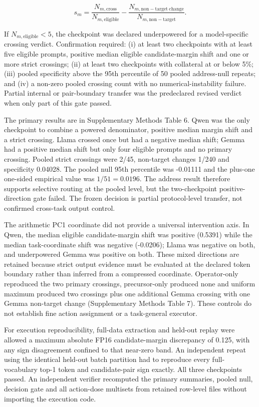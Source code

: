 \documentclass[10pt]{article}
\begin{document}
\begin{equation*}
s_m=\frac{N_{m,\mathrm{cross}}}{N_{m,\mathrm{eligible}}}-
\frac{N_{m,\mathrm{non-target\ change}}}{N_{m,\mathrm{non-target}}}.
\end{equation*}

If \(N_{m,\mathrm{eligible}}<5\), the checkpoint was declared underpowered for a model-specific crossing verdict. Confirmation required: (i) at least two checkpoints with at least five eligible prompts, positive median eligible candidate-margin shift and one or more strict crossings; (ii) at least two checkpoints with collateral at or below 5\%; (iii) pooled specificity above the 95th percentile of 50 pooled address-null repeats; and (iv) a non-zero pooled crossing count with no numerical-instability failure. Partial internal or pair-boundary transfer was the predeclared revised verdict when only part of this gate passed.

The primary results are in Supplementary Methods Table 6. Qwen was the only checkpoint to combine a powered denominator, positive median margin shift and a strict crossing. Llama crossed once but had a negative median shift; Gemma had a positive median shift but only four eligible prompts and no primary crossing. Pooled strict crossings were 2/45, non-target changes 1/240 and specificity 0.04028. The pooled null 95th percentile was -0.01111 and the plus-one one-sided empirical value was \(1/51=0.0196\). The address result therefore supports selective routing at the pooled level, but the two-checkpoint positive-direction gate failed. The frozen decision is partial protocol-level transfer, not confirmed cross-task output control.

The arithmetic PC1 coordinate did not provide a universal intervention axis. In Qwen, the median eligible candidate-margin shift was positive (0.5391) while the median task-coordinate shift was negative (-0.0206); Llama was negative on both, and underpowered Gemma was positive on both. These mixed directions are retained because strict output evidence must be evaluated at the declared token boundary rather than inferred from a compressed coordinate. Operator-only reproduced the two primary crossings, precursor-only produced none and uniform maximum produced two crossings plus one additional Gemma crossing with one Gemma non-target change (Supplementary Methods Table 7). These controls do not establish fine action assignment or a task-general executor.

For execution reproducibility, full-data extraction and held-out replay were allowed a maximum absolute FP16 candidate-margin discrepancy of 0.125, with any sign disagreement confined to that near-zero band. An independent repeat using the identical held-out batch partition had to reproduce every full-vocabulary top-1 token and candidate-pair sign exactly. All three checkpoints passed. An independent verifier recomputed the primary summaries, pooled null, decision gate and all action-dose multisets from retained row-level files without importing the execution code.
\end{document}
